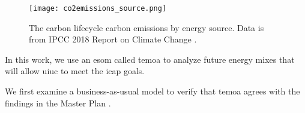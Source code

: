 \begin{figure}[h]
  \centering
  \texttt{[image: co2emissions\_source.png]}
  \caption{The carbon lifecycle carbon emissions by energy source. Data is from
  IPCC 2018 Report on Climate Change \cite{allen_framing_2018}.}
  \label{fig:co2sources}
\end{figure}

In this work, we use an \gls{esom} called \gls{temoa}
to analyze future energy mixes that will allow \gls{uiuc} to meet the
\gls{icap} goals.

We first examine a business-as-usual model to verify that \gls{temoa} agrees
with the findings in the Master Plan
\cite{affiliated_engineers_inc_utilities_2015}.
